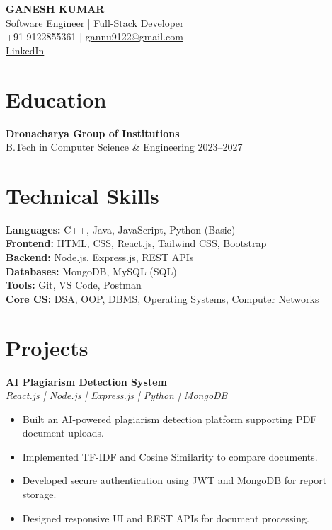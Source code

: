 \documentclass[10pt,a4paper]{article}
\begin{document}
\begin{center}
{\LARGE \textbf{GANESH KUMAR}}\\
\vspace{2mm}
Software Engineer | Full-Stack Developer\\
\vspace{2mm}
+91-9122855361 \quad|\quad
\href{mailto:gannu9122@gmail.com}{gannu9122@gmail.com}\\
\href{https://www.linkedin.com/in/ganesh-kumar-2a46b82a4}{LinkedIn}
\end{center}

\section*{Education}
\textbf{Dronacharya Group of Institutions}\\
B.Tech in Computer Science \& Engineering \hfill 2023--2027

\section*{Technical Skills}
\textbf{Languages:} C++, Java, JavaScript, Python (Basic)\\
\textbf{Frontend:} HTML, CSS, React.js, Tailwind CSS, Bootstrap\\
\textbf{Backend:} Node.js, Express.js, REST APIs\\
\textbf{Databases:} MongoDB, MySQL (SQL)\\
\textbf{Tools:} Git, VS Code, Postman\\
\textbf{Core CS:} DSA, OOP, DBMS, Operating Systems, Computer Networks

\section*{Projects}

\textbf{AI Plagiarism Detection System}\\
\textit{React.js | Node.js | Express.js | Python | MongoDB}
\begin{itemize}[leftmargin=*]
\item Built an AI-powered plagiarism detection platform supporting PDF document uploads.
\item Implemented TF-IDF and Cosine Similarity to compare documents.
\item Developed secure authentication using JWT and MongoDB for report storage.
\item Designed responsive UI and REST APIs for document processing.
\end{itemize}
\end{document}
